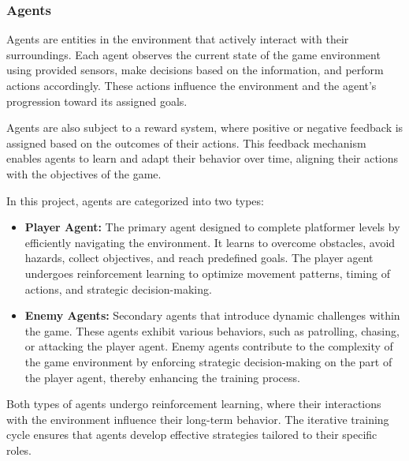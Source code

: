 \documentclass[12pt,oneside,openright,a4paper]{cpe-english-project}
\begin{document}
\subsubsection{Agents}
Agents are entities in the environment that actively interact with their surroundings. Each agent observes the current state of the game environment using provided sensors, make decisions based on the information, and perform actions accordingly. These actions influence the environment and the agent's progression toward its assigned goals.\par
Agents are also subject to a reward system, where positive or negative feedback is assigned based on the outcomes of their actions. This feedback mechanism enables agents to learn and adapt their behavior over time, aligning their actions with the objectives of the game.\par
In this project, agents are categorized into two types:
\begin{itemize}
\item  \textbf{Player Agent:} The primary agent designed to complete platformer levels by efficiently navigating the environment. It learns to overcome obstacles, avoid hazards, collect objectives, and reach predefined goals. The player agent undergoes reinforcement learning to optimize movement patterns, timing of actions, and strategic decision-making.
\item  \textbf{Enemy Agents:} Secondary agents that introduce dynamic challenges within the game. These agents exhibit various behaviors, such as patrolling, chasing, or attacking the player agent. Enemy agents contribute to the complexity of the game environment by enforcing strategic decision-making on the part of the player agent, thereby enhancing the training process.
\end{itemize}
Both types of agents undergo reinforcement learning, where their interactions with the environment influence their long-term behavior. The iterative training cycle ensures that agents develop effective strategies tailored to their specific roles.\par
\end{document}
